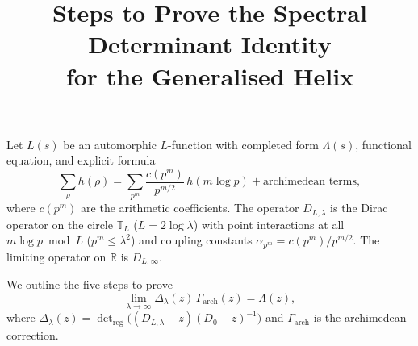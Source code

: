 \documentclass[12pt,a4paper]{article}
\title{\bf Steps to Prove the Spectral Determinant Identity\\ for the Generalised Helix}
\author{}
\date{}
\begin{document}
\maketitle

Let \(L(s)\) be an automorphic \(L\)-function with completed form \(\Lambda(s)\), functional equation, and explicit formula
\[
\sum_{\rho} h(\rho) = \sum_{p^m} \frac{c(p^m)}{p^{m/2}}\,h(m\log p) + \text{archimedean terms},
\]
where \(c(p^m)\) are the arithmetic coefficients.  The operator \(D_{L,\lambda}\) is the Dirac operator on the circle \(\mathbb{T}_L\) (\(L = 2\log\lambda\)) with point interactions at all \(m\log p \bmod L\) (\(p^m \le \lambda^2\)) and coupling constants \(\alpha_{p^m} = c(p^m)/p^{m/2}\).  The limiting operator on \(\mathbb{R}\) is \(D_{L,\infty}\).

We outline the five steps to prove
\[
\lim_{\lambda\to\infty} \Delta_\lambda(z)\,\Gamma_{\text{arch}}(z) = \Lambda(z),
\]
where \(\Delta_\lambda(z) = \det_{\text{reg}}\bigl((D_{L,\lambda} - z)(D_0 - z)^{-1}\bigr)\) and \(\Gamma_{\text{arch}}\) is the archimedean correction.
\end{document}
